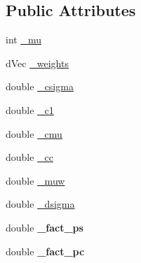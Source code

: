 \subsection*{Public Attributes}
\begin{DoxyCompactItemize}
\item 
int \hyperlink{classlibcmaes_1_1CMAParameters_a102a49af5856035c4568178f4847e2e8}{\-\_\-mu}
\item 
d\-Vec \hyperlink{classlibcmaes_1_1CMAParameters_aa8eeb4ea2a91da73f1d53fa74d950049}{\-\_\-weights}
\item 
double \hyperlink{classlibcmaes_1_1CMAParameters_a9fc0879daeaeeb882192feddb0efecfc}{\-\_\-csigma}
\item 
double \hyperlink{classlibcmaes_1_1CMAParameters_ad6c921f865fc7fc344e8e1408baca772}{\-\_\-c1}
\item 
double \hyperlink{classlibcmaes_1_1CMAParameters_a0d4da3faa7fba9eb555d7dbfee7a6402}{\-\_\-cmu}
\item 
double \hyperlink{classlibcmaes_1_1CMAParameters_af85bfd2cef329712654fc697f50d5b4a}{\-\_\-cc}
\item 
double \hyperlink{classlibcmaes_1_1CMAParameters_afc24dfb50427ae6963515f8508f5759d}{\-\_\-muw}
\item 
double \hyperlink{classlibcmaes_1_1CMAParameters_a87f2b165fab84e65672361e5d6ac7f3d}{\-\_\-dsigma}
\item 
\hypertarget{classlibcmaes_1_1CMAParameters_abe4513aa9d69895e267c0ecde3bf5508}{double {\bfseries \-\_\-fact\-\_\-ps}}\label{classlibcmaes_1_1CMAParameters_abe4513aa9d69895e267c0ecde3bf5508}

\item 
\hypertarget{classlibcmaes_1_1CMAParameters_a24700ad95612d4a5d926b832ae02bcdf}{double {\bfseries \-\_\-fact\-\_\-pc}}\label{classlibcmaes_1_1CMAParameters_a24700ad95612d4a5d926b832ae02bcdf}


\end{DoxyCompactItemize}
